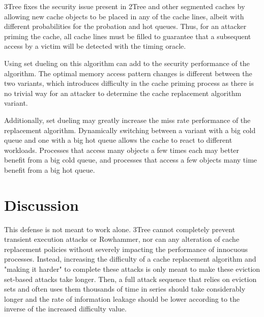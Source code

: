 \documentclass[letterpaper]{article}
\begin{document}
3Tree fixes the security issue present in 2Tree and other segmented caches
by allowing new cache objects to be placed in any of the cache lines,
albeit with different probabilities for the probation and hot queues.
Thus, for an attacker priming the cache, all cache lines must be filled to guarantee
that a subsequent access by a victim will be detected with the timing oracle.

Using set dueling on this algorithm can add to the security performance of the algorithm.
The optimal memory access pattern changes is different between the two variants,
which introduces difficulty in the cache priming process \cite{EvictionSetsAtScale}
as there is no trivial way for an attacker to determine the cache replacement algorithm variant.

Additionally, set dueling may greatly increase the miss rate performance of the replacement algorithm.
Dynamically switching between a variant with a big cold queue and one with a big hot queue
allows the cache to react to different workloads.
Processes that access many objects a few times each may better benefit from a big cold queue,
and processes that access a few objects many time benefit from a big hot queue.



\section{Discussion}

This defense is not meant to work alone.
3Tree cannot completely prevent transient execution attacks or Rowhammer,
nor can any alteration of cache replacement policies
without severely impacting the performance of innocuous processes.
Instead, increasing the difficulty of a cache replacement algorithm
and "making it harder" to complete these attacks
is only meant to make these eviction set-based attacks take longer.
Then, a full attack sequence that relies on eviction sets and often uses them
thousands of time in series \cite{Gofetch} should take considerably longer
and the rate of information leakage should be lower according to the
inverse of the increased difficulty value.
\end{document}
